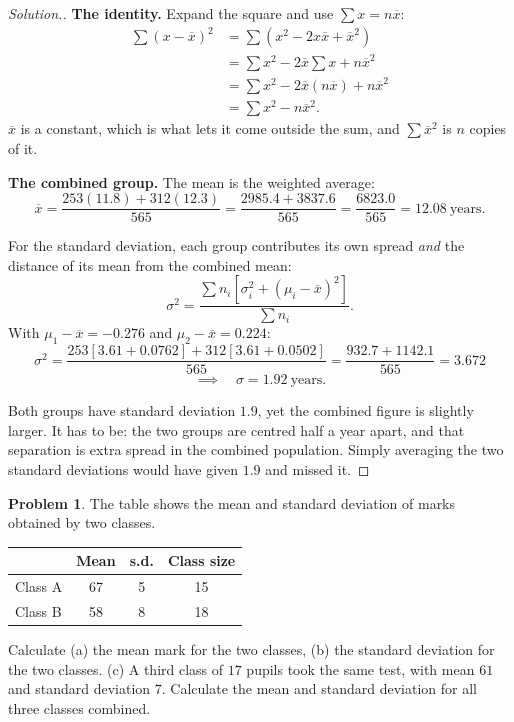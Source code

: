 \documentclass[11pt,a4paper]{article}
\theoremstyle{definition}
\newtheorem{problemx}{Problem}[section]
\newenvironment{problem}{\begin{problemx}}{\end{problemx}}
\newenvironment{solution}
  {\renewcommand{\qedsymbol}{}\begin{proof}[\textit{Solution}.]}
  {\end{proof}}
\begin{document}
\begin{solution}
\textbf{The identity.} Expand the square and use $\sum x=n\overline{x}$:
\begin{align*}
\sum (x-\overline{x})^2 &=\sum \left(x^2-2x\overline{x}+\overline{x}^2\right)\\
&=\sum x^2-2\overline{x}\sum x+n\overline{x}^2\\
&=\sum x^2-2\overline{x}(n\overline{x})+n\overline{x}^2\\
&=\sum x^2-n\overline{x}^2.
\end{align*}
$\overline{x}$ is a constant, which is what lets it come outside the sum, and
$\sum \overline{x}^2$ is $n$ copies of it.

\textbf{The combined group.} The mean is the weighted average:
\[\overline{x}=\frac{253(11.8)+312(12.3)}{565}=\frac{2985.4+3837.6}{565}=\frac{6823.0}{565}=12.08\ \text{years}.\]

For the standard deviation, each group contributes its own spread \emph{and} the distance of
its mean from the combined mean:
\[\sigma^2=\frac{\sum n_i\left[\sigma_i^2+(\mu_i-\overline{x})^2\right]}{\sum n_i}.\]
With $\mu_1-\overline{x}=-0.276$ and $\mu_2-\overline{x}=0.224$:
\[\sigma^2=\frac{253\left[3.61+0.0762\right]+312\left[3.61+0.0502\right]}{565}
=\frac{932.7+1142.1}{565}=3.672\]
\[\implies\quad \sigma=1.92\ \text{years}.\]

Both groups have standard deviation $1.9$, yet the combined figure is slightly larger. It
has to be: the two groups are centred half a year apart, and that separation is extra spread
in the combined population. Simply averaging the two standard deviations would have given
$1.9$ and missed it.
\end{solution}

\begin{problem}
The table shows the mean and standard deviation of marks obtained by two classes.
\begin{table}[H]
\centering
\begin{tabular}{|l|c|c|c|}
\hline
 & Mean & s.d. & Class size\\
\hline
Class A & 67 & 5 & 15\\
Class B & 58 & 8 & 18\\
\hline
\end{tabular}
\end{table}
Calculate (a) the mean mark for the two classes, (b) the standard deviation for the two
classes. (c) A third class of $17$ pupils took the same test, with mean $61$ and standard
deviation $7$. Calculate the mean and standard deviation for all three classes combined.
\end{problem}
\end{document}
